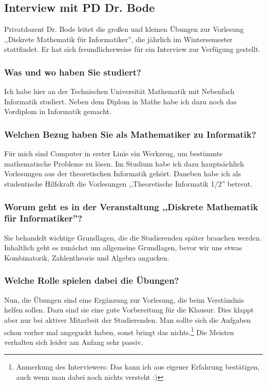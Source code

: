 \subsection{Interview mit PD Dr. Bode}

Privatdozent Dr. Bode leitet die großen und kleinen Übungen zur
Vorlesung ,,Diskrete Mathematik für Informatiker'', die jährlich im
Wintersemester stattfindet.  Er hat sich
freundlicherweise für ein Interview zur Verfügung gestellt.

\subsubsection{Was und wo haben Sie studiert?}
Ich habe hier an der Technischen Universität Mathematik mit Nebenfach
Informatik studiert. Neben dem Diplom in Mathe habe ich dazu noch das
Vordiplom in Informatik gemacht.

\subsubsection{Welchen Bezug haben Sie als Mathematiker zu Informatik?}
Für mich sind Computer in erster Linie ein Werkzeug, um bestimmte
mathematische Probleme zu lösen. Im Studium habe ich dazu
hauptsächlich Vorlesungen aus der theoretischen Informatik
gehört. Daneben habe ich als studentische Hilfskraft die Vorlesungen
,,Theoretische Informatik 1/2'' betreut.

\subsubsection{Worum geht es in der Veranstaltung ,,Diskrete Mathematik für
Informatiker''?}
Sie behandelt wichtige Grundlagen, die die Studierenden später
brauchen werden. Inhaltlich geht es zunächst um allgemeine Grundlagen,
bevor wir uns etwas Kombinatorik, Zahlentheorie und Algebra angucken.

\subsubsection{Welche Rolle spielen dabei die Übungen?}
Nun, die Übungen sind eine Ergänzung zur Vorlesung, die beim
Verständnis helfen sollen. Dazu sind sie eine gute Vorbereitung für
die Klausur. Dies klappt aber nur bei aktiver Mitarbeit der
Studierenden. Man sollte sich die Aufgaben schon vorher mal angeguckt
haben, sonst bringt das nichts.\footnote{Anmerkung des Interviewers:
Das kann ich aus eigener Erfahrung bestätigen, auch wenn man dabei
noch nichts versteht :)} Die Meisten verhalten sich leider am Anfang
sehr passiv.

